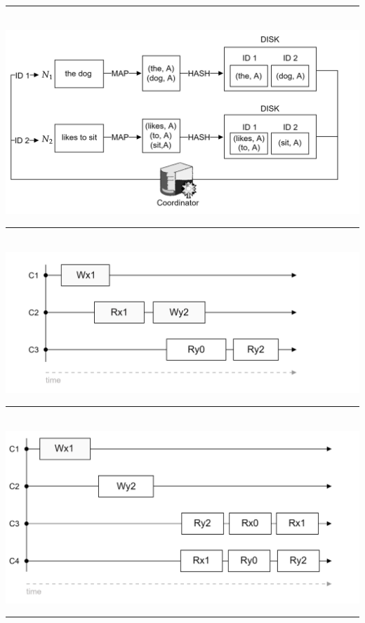 \begin{multicols}{2}
\noindent
\rule{\linewidth}{0.4pt}\\

\hspace{-1.5em}
\includegraphics[width=\linewidth]{Sections/mapreduce/nwork.png}\\
\noindent
\rule{\linewidth}{0.4pt}\\

\hspace{-1.5em}
\includegraphics[width=\linewidth]{Sections/consist/test.png}\\
\noindent
\rule{\linewidth}{0.4pt}\\

\hspace{-1.5em}
\includegraphics[width=\linewidth]{Sections/consist/event.png}\\
\noindent
\rule{\linewidth}{0.4pt}\\


\end{multicols}
